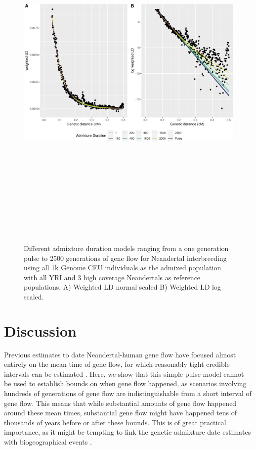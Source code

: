 \documentclass[11pt]{article}
\begin{document}
\begin{figure}
\centering
\includegraphics[width=16cm,height=18cm,keepaspectratio]{Admixture_Time_Inference_Paper_Draft_files/figure-latex/fig5-1.pdf}
\caption{\label{fig:fig5} Different admixture duration models ranging
from a one generation pulse to 2500 generations of gene flow for Neandertal interbreeding using all 1k Genome CEU individuals as the admixed population
with all YRI and 3 high coverage Neandertals as reference populations. A) Weighted LD normal scaled B) Weighted LD log scaled.}
\end{figure}

\section{Discussion}\label{discussion}
Previous estimates to date Neandertal-human gene flow have focused almost entirely on the mean time of gene flow, for which reasonably tight credible intervals can be estimated \citep{sankararaman_date_2012, moorjani_genetic_2016}. Here, we show that this simple pulse model cannot be used to establish bounds on when gene flow happened, as scenarios involving hundreds of generations of gene flow are indistinguishable from a short interval of gene flow. This means that while substantial amounts of gene flow happened around these mean times, substantial gene flow might have happened tens of thousands of years before or after these bounds. This is of great practical importance, as it might be tempting to link the genetic admixture date estimates with biogeographical events \citep{sankararaman_date_2012,lazaridis_genomic_2016,douka_age_2019,jacobs_multiple_2019,vyas_analyses_2019}. 
\end{document}
